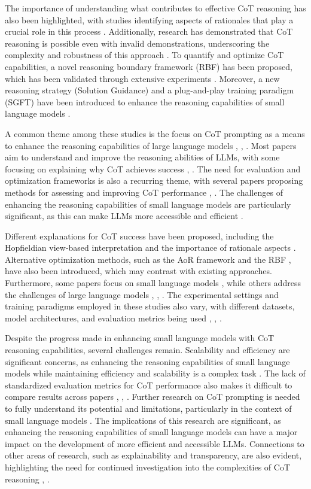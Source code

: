 \documentclass[conference]{IEEEtran}
\begin{document}
The importance of understanding what contributes to effective CoT reasoning has also been highlighted, with studies identifying aspects of rationales that play a crucial role in this process \cite{b6}. Additionally, research has demonstrated that CoT reasoning is possible even with invalid demonstrations, underscoring the complexity and robustness of this approach \cite{b7}. To quantify and optimize CoT capabilities, a novel reasoning boundary framework (RBF) has been proposed, which has been validated through extensive experiments \cite{b8}. Moreover, a new reasoning strategy (Solution Guidance) and a plug-and-play training paradigm (SGFT) have been introduced to enhance the reasoning capabilities of small language models \cite{b9}.

A common theme among these studies is the focus on CoT prompting as a means to enhance the reasoning capabilities of large language models \cite{b1}, \cite{b2}, \cite{b3}. Most papers aim to understand and improve the reasoning abilities of LLMs, with some focusing on explaining why CoT achieves success \cite{b4}, \cite{b6}. The need for evaluation and optimization frameworks is also a recurring theme, with several papers proposing methods for assessing and improving CoT performance \cite{b5}, \cite{b8}. The challenges of enhancing the reasoning capabilities of small language models are particularly significant, as this can make LLMs more accessible and efficient \cite{b9}.

Different explanations for CoT success have been proposed, including the Hopfieldian view-based interpretation \cite{b4} and the importance of rationale aspects \cite{b6}. Alternative optimization methods, such as the AoR framework \cite{b5} and the RBF \cite{b8}, have also been introduced, which may contrast with existing approaches. Furthermore, some papers focus on small language models \cite{b9}, while others address the challenges of large language models \cite{b1}, \cite{b2}, \cite{b3}. The experimental settings and training paradigms employed in these studies also vary, with different datasets, model architectures, and evaluation metrics being used \cite{b1}, \cite{b5}, \cite{b9}.

Despite the progress made in enhancing small language models with CoT reasoning capabilities, several challenges remain. Scalability and efficiency are significant concerns, as enhancing the reasoning capabilities of small language models while maintaining efficiency and scalability is a complex task \cite{b9}. The lack of standardized evaluation metrics for CoT performance also makes it difficult to compare results across papers \cite{b1}, \cite{b5}, \cite{b8}. Further research on CoT prompting is needed to fully understand its potential and limitations, particularly in the context of small language models \cite{b9}. The implications of this research are significant, as enhancing the reasoning capabilities of small language models can have a major impact on the development of more efficient and accessible LLMs. Connections to other areas of research, such as explainability and transparency, are also evident, highlighting the need for continued investigation into the complexities of CoT reasoning \cite{b4}, \cite{b6}.
\end{document}
